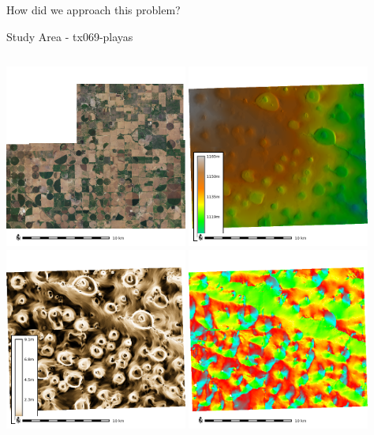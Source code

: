 \documentclass[
  ignorenonframetext,
]{beamer}
\begin{document}
\begin{frame}[fragile]{How did we approach this problem?}
\begin{block}{Study Area - tx069-playas}
\label{study-area---tx069-playas}
\begin{columns}[T]
\begin{column}{0.5\textwidth}
\includegraphics[width=0.45\textwidth,height=\textheight]{../output/tx069-playas//naip.png}
\includegraphics[width=0.45\textwidth,height=\textheight]{../output/tx069-playas/elev.png}
\includegraphics[width=0.45\textwidth,height=\textheight]{../output/tx069-playas/slope.png}
\includegraphics[width=0.45\textwidth,height=\textheight]{../output/tx069-playas/aspect.png}
\end{column}


\end{columns}
\end{block}
\end{frame}
\end{document}
